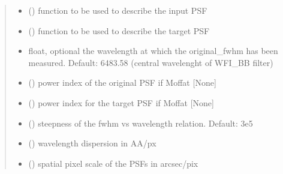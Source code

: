 \documentclass[letterpaper,10pt,english]{sphinxmanual}
\begin{document}
\begin{fulllineitems}
\begin{quote}
\begin{description}
\begin{itemize}
\item {} 
\sphinxAtStartPar
{} () \textendash{} function to be used to describe the input PSF

\item {} 
\sphinxAtStartPar
{} () \textendash{} function to be used to describe the target PSF

\item {} 
\sphinxAtStartPar
{} \textendash{} float, optional
the wavelength at which the original\_fwhm has been measured.
Default: 6483.58 (central wavelenght of WFI\_BB filter)

\item {} 
\sphinxAtStartPar
{} () \textendash{} power index of the original PSF if Moffat {[}None{]}

\item {} 
\sphinxAtStartPar
{} () \textendash{} power index for the target PSF if Moffat {[}None{]}

\item {} 
\sphinxAtStartPar
{} () \textendash{} steepness of the fwhm vs wavelength relation. Default: \sphinxhyphen{}3e\sphinxhyphen{}5

\item {} 
\sphinxAtStartPar
{} () \textendash{} wavelength dispersion in AA/px

\item {} 
\sphinxAtStartPar
{} () \textendash{} spatial pixel scale of the PSFs in arcsec/pix


\end{itemize}
\end{description}
\end{quote}
\end{fulllineitems}
\end{document}
